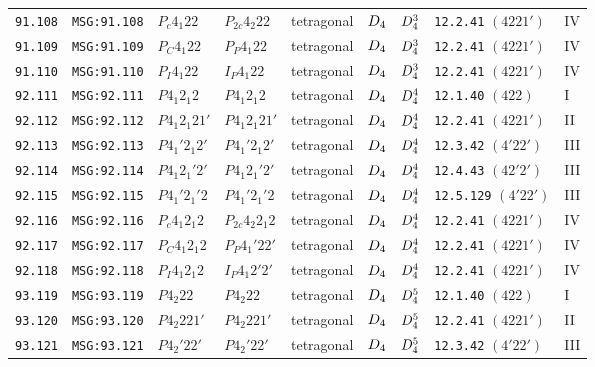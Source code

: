 \documentclass[fleqn,10pt]{jsarticle}
\begin{document}
\begin{center}
\begin{longtable}{lllllllll}
\texttt{91.108} & \texttt{MSG:91.108} & $P_{c}4_{1}22$ & $P_{2c}4_{2}22$ & tetragonal & $D_{\rm 4}$ & $D_{\rm 4}^{3}$ & \texttt{12.2.41} $(4221')$ & IV \\
\texttt{91.109} & \texttt{MSG:91.109} & $P_{C}4_{1}22$ & $P_{P}4_{1}22$ & tetragonal & $D_{\rm 4}$ & $D_{\rm 4}^{3}$ & \texttt{12.2.41} $(4221')$ & IV \\
\texttt{91.110} & \texttt{MSG:91.110} & $P_{I}4_{1}22$ & $I_{P}4_{1}22$ & tetragonal & $D_{\rm 4}$ & $D_{\rm 4}^{3}$ & \texttt{12.2.41} $(4221')$ & IV \\ \hline
\texttt{92.111} & \texttt{MSG:92.111} & $P4_{1}2_{1}2$ & $P4_{1}2_{1}2$ & tetragonal & $D_{\rm 4}$ & $D_{\rm 4}^{4}$ & \texttt{12.1.40} $(422)$ & I \\
\texttt{92.112} & \texttt{MSG:92.112} & $P4_{1}2_{1}21'$ & $P4_{1}2_{1}21'$ & tetragonal & $D_{\rm 4}$ & $D_{\rm 4}^{4}$ & \texttt{12.2.41} $(4221')$ & II \\
\texttt{92.113} & \texttt{MSG:92.113} & $P4_{1}'2_{1}2'$ & $P4_{1}'2_{1}2'$ & tetragonal & $D_{\rm 4}$ & $D_{\rm 4}^{4}$ & \texttt{12.3.42} $(4'22')$ & III \\
\texttt{92.114} & \texttt{MSG:92.114} & $P4_{1}2_{1}'2'$ & $P4_{1}2_{1}'2'$ & tetragonal & $D_{\rm 4}$ & $D_{\rm 4}^{4}$ & \texttt{12.4.43} $(42'2')$ & III \\
\texttt{92.115} & \texttt{MSG:92.115} & $P4_{1}'2_{1}'2$ & $P4_{1}'2_{1}'2$ & tetragonal & $D_{\rm 4}$ & $D_{\rm 4}^{4}$ & \texttt{12.5.129} $(4'22')$ & III \\
\texttt{92.116} & \texttt{MSG:92.116} & $P_{c}4_{1}2_{1}2$ & $P_{2c}4_{2}2_{1}2$ & tetragonal & $D_{\rm 4}$ & $D_{\rm 4}^{4}$ & \texttt{12.2.41} $(4221')$ & IV \\
\texttt{92.117} & \texttt{MSG:92.117} & $P_{C}4_{1}2_{1}2$ & $P_{P}4_{1}'22'$ & tetragonal & $D_{\rm 4}$ & $D_{\rm 4}^{4}$ & \texttt{12.2.41} $(4221')$ & IV \\
\texttt{92.118} & \texttt{MSG:92.118} & $P_{I}4_{1}2_{1}2$ & $I_{P}4_{1}2'2'$ & tetragonal & $D_{\rm 4}$ & $D_{\rm 4}^{4}$ & \texttt{12.2.41} $(4221')$ & IV \\ \hline
\texttt{93.119} & \texttt{MSG:93.119} & $P4_{2}22$ & $P4_{2}22$ & tetragonal & $D_{\rm 4}$ & $D_{\rm 4}^{5}$ & \texttt{12.1.40} $(422)$ & I \\
\texttt{93.120} & \texttt{MSG:93.120} & $P4_{2}221'$ & $P4_{2}221'$ & tetragonal & $D_{\rm 4}$ & $D_{\rm 4}^{5}$ & \texttt{12.2.41} $(4221')$ & II \\
\texttt{93.121} & \texttt{MSG:93.121} & $P4_{2}'22'$ & $P4_{2}'22'$ & tetragonal & $D_{\rm 4}$ & $D_{\rm 4}^{5}$ & \texttt{12.3.42} $(4'22')$ & III \\

\end{longtable}
\end{center}
\end{document}

